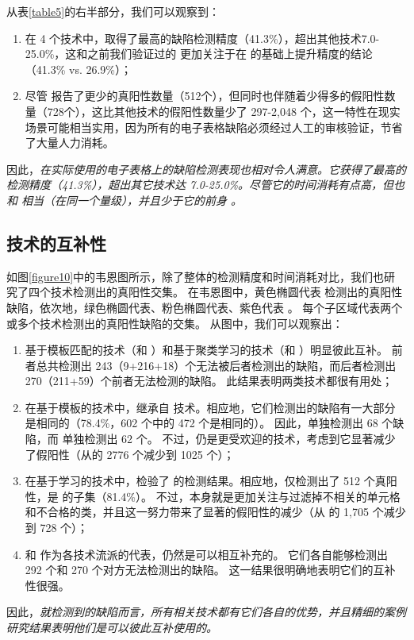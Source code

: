 


从表\ref{table5}的右半部分，我们可以观察到：
\begin{enumerate}
    \item 在 4 个技术中，\wa 取得了最高的缺陷检测精度（41.3\%），超出其他技术7.0-25.0\%，这和之前我们验证过的 \wa 更加关注于在 \cu 的基础上提升精度的结论（41.3\% vs. 26.9\%）；
    \item 尽管 \wa 报告了更少的真阳性数量（512个），但同时也伴随着少得多的假阳性数量（728个），这比其他技术的假阳性数量少了 297-2,048 个，这一特性在现实场景可能相当实用，因为所有的电子表格缺陷必须经过人工的审核验证，节省了大量人力消耗。
\end{enumerate}

因此，\textit{\wa 在实际使用的电子表格上的缺陷检测表现也相对令人满意。它获得了最高的检测精度（41.3\%），超出其它技术达 7.0-25.0\%。尽管它的时间消耗有点高，但也和 \ca 相当（在同一个量级），并且少于它的前身 \cu。}

\subsection{技术的互补性}
如图\ref{figure10}中的韦恩图所示，除了整体的检测精度和时间消耗对比，我们也研究了四个技术检测出的真阳性交集。
在韦恩图中，黄色椭圆代表 \am 检测出的真阳性缺陷，依次地，绿色椭圆代表\ca 、粉色椭圆代表\cu 、紫色代表 \wa 。
每个子区域代表两个或多个技术检测出的真阳性缺陷的交集。
从图中，我们可以观察出：
\begin{enumerate}
    \item 基于模板匹配的技术（\am 和 \ca）和基于聚类学习的技术（\cu 和 \wa）明显彼此互补。
    前者总共检测出 243（9+216+18）个无法被后者检测出的缺陷，而后者检测出 270（211+59）个前者无法检测的缺陷。
    此结果表明两类技术都很有用处；

    \item 在基于模板的技术中，\ca 继承自 \am 技术。相应地，它们检测出的缺陷有一大部分是相同的（78.4\%，602 个中的 472 个是相同的）。
    因此，\am 单独检测出 68 个缺陷，而 \ca 单独检测出 62 个。
    不过，\ca 仍是更受欢迎的技术，考虑到它显著减少了假阳性（从\am 的 2776 个减少到 1025 个）；
    
    \item 在基于学习的技术中，\wa 检验了 \cu 的检测结果。相应地，\wa 仅检测出了 512 个真阳性，是 \cu 的子集（81.4\%）。
    不过，\wa 本身就是更加关注与过滤掉不相关的单元格和不合格的类，并且这一努力带来了显著的假阳性的减少（从 \cu 的 1,705 个减少到 728 个）；
    
    \item \ca 和 \wa 作为各技术流派的代表，仍然是可以相互补充的。
    它们各自能够检测出 292 个和 270 个对方无法检测出的缺陷。
    这一结果很明确地表明它们的互补性很强。
\end{enumerate}

因此，\textit{就检测到的缺陷而言，所有相关技术都有它们各自的优势，并且精细的案例研究结果表明他们是可以彼此互补使用的。}
